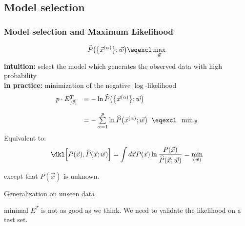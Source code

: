 \subsection{Model selection}
\begin{frame} \frametitle{Model selection and Maximum Likelihood}
\begin{equation*}
        \widehat{P}\big(\big\{\vec{x}^{(\alpha)}\big\};\vec{w}\big)
                \eqexcl \max_{\vec{w}}
\end{equation*}
\textbf{intuition:} select the model which generates the observed data with high probability\\
\vspace{5mm}
\textbf{in practice:} minimization of the negative $\log$-likelihood
\begin{equation*}
        \begin{array}{ll}
                p \cdot E_{[\vec{w}]}^T
                & = -\ln \widehat{P}\big(\big\{\vec{x}^{(\alpha)}\big\}
                        ;\vec{w}\big) \\\\
                & = -\sum\limits_{\alpha = 1}^p \ln \widehat{P}
                        \big( \vec{x}^{(\alpha)};\vec{w} \big)
                \;\; \eqexcl \;\; \min_{\vec{w}} 
        \end{array}
\end{equation*}
Equivalent to:
\begin{equation}
	\dkl\Big[P(\vec{x}),\widehat{P}(\vec{x};\vec{w})\Big] = \int d \vec{x} P(\vec{x}) \ln 
		\frac{P(\vec{x})}{\widehat{P}(\vec{x};\vec{w})} = \min_{(\vec{w})}
\end{equation}

except that $P(\vec{x})$ is unknown.

\end{frame}

\begin{frame}{Generalization on unseen data}

minimal $E^T$ is not as good as we think. We need to validate the likelihood on a test set.

\end{frame}
